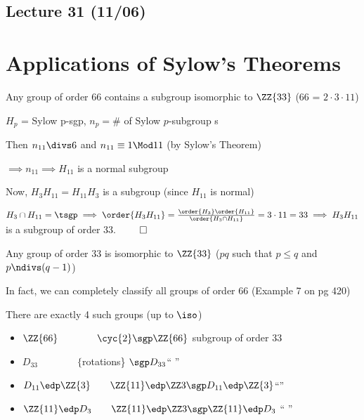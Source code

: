 \subsection*{Lecture 31 (11/06)} %
\section*{Applications of Sylow's Theorems}
\begin{example}
     Any group of order 66 contains a subgroup isomorphic to \(\ZZ{33}\) (66 = \(2\cdot 3 \cdot 11\))

     \(H_p\) = Sylow p-sgp, \(n_p = \)\# of Sylow \(p\)-subgroup s

    Then \(n_{11}\divs 6\) and \(n_{11}\equiv 1\Mod 11\) (by Sylow's Theorem)

    \(\implies n_{11} \implies H_{11}\) is a normal subgroup

    Now, \(H_3H_{11} = H_{11}H_3\) is a subgroup (since \(H_{11}\) is normal)

    \(H_3\cap H_{11} = \tsgp \implies \order{H_3H_{11}}=\frac{\order{H_3}\order{H_{11}}}{\order{H_3\cap H_{11}}} = 3\cdot 11 = 33 \implies H_3H_{11}\) is a subgroup of order 33. \(\qed\)
  \end{example}
  \begin{note}
      Any group of order 33 is isomorphic to \(\ZZ{33}\) (\(pq\) such that \(p\leq q\) and \(p\ndivs (q-1)\))
  \end{note}
In fact, we can completely classify all groups of order 66 (Example 7 on pg 420)

There are exactly 4 such groups (up to \(\iso\))\begin{itemize}
    \item \(\ZZ{66}\qquad\qquad \cyc{2}\sgp \ZZ{66}\) \quad subgroup of order 33
    \item \(D_{33}\qquad\qquad \{\)rotations\} \(\sgp D_{33}\)\quad ``  \quad''
    \item \(D_{11}\edp\ZZ{3}\qquad \ZZ{11}\edp \ZZ 3 \sgp D_{11}\edp\ZZ{3}\)\quad ``\quad  ''
    \item \(\ZZ{11}\edp D_3 \qquad \ZZ{11}\edp \ZZ 3 \sgp \ZZ{11}\edp D_3\) \quad`` \quad ''
\end{itemize}

